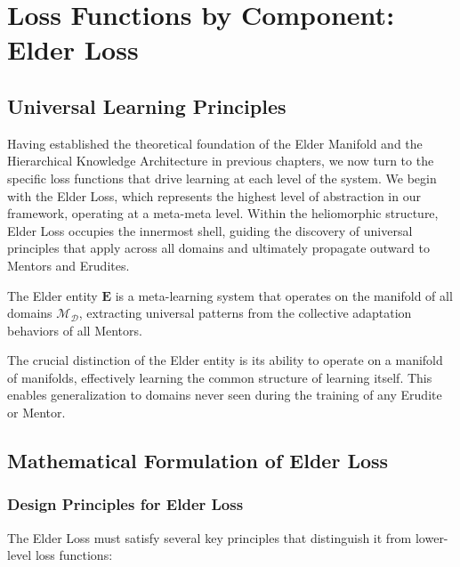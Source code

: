 \chapter{Loss Functions by Component: Elder Loss}

\section{Universal Learning Principles}

Having established the theoretical foundation of the Elder Manifold and the Hierarchical Knowledge Architecture in previous chapters, we now turn to the specific loss functions that drive learning at each level of the system. We begin with the Elder Loss, which represents the highest level of abstraction in our framework, operating at a meta-meta level. Within the heliomorphic structure, Elder Loss occupies the innermost shell, guiding the discovery of universal principles that apply across all domains and ultimately propagate outward to Mentors and Erudites.

\begin{definition}
The Elder entity $\textbf{E}$ is a meta-learning system that operates on the manifold of all domains $\mathcal{M}_{\mathcal{D}}$, extracting universal patterns from the collective adaptation behaviors of all Mentors.
\end{definition}

The crucial distinction of the Elder entity is its ability to operate on a manifold of manifolds, effectively learning the common structure of learning itself. This enables generalization to domains never seen during the training of any Erudite or Mentor.

\section{Mathematical Formulation of Elder Loss}

\subsection{Design Principles for Elder Loss}

The Elder Loss must satisfy several key principles that distinguish it from lower-level loss functions:

